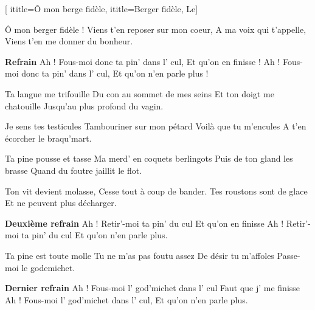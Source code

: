 [
  ititle={Ô mon berge fidèle},
  ititle={Berger fidèle, Le}]

  
\beginverse
Ô mon berger fidèle !
Viens t'en reposer sur mon coeur,
A ma voix qui t'appelle,
Viens t'en me donner du bonheur.
\endverse

\beginchorus
\textbf{Refrain}
Ah ! Fous-moi donc ta pin' dans l' cul,
Et qu'on en finisse !
Ah ! Fous-moi donc ta pin' dans l' cul,
Et qu'on n'en parle plus !
\endchorus

\beginverse
Ta langue me trifouille
Du con au sommet de mes seins
Et ton doigt me chatouille
Jusqu'au plus profond du vagin.
\endverse

\beginverse
Je sens tes testicules
Tambouriner sur mon pétard
Voilà que tu m'encules
A t'en écorcher le braqu'mart.
\endverse

\beginverse
Ta pine pousse et tasse
Ma merd' en coquets berlingots
Puis de ton gland les brasse
Quand du foutre jaillit le flot.
\endverse

\beginverse
Ton vit devient molasse,
Cesse tout à coup de bander.
Tes roustons sont de glace
Et ne peuvent plus décharger.
\endverse

\beginchorus
\textbf{Deuxième refrain}
Ah ! Retir'-moi ta pin' du cul
Et qu'on en finisse
Ah ! Retir'-moi ta pin' du cul
Et qu'on n'en parle plus.
\endchorus

\beginverse
Ta pine est toute molle
Tu ne m'as pas foutu assez
De désir tu m'affoles
Passe-moi le godemichet.
\endverse

\beginchorus
\textbf{Dernier refrain}
Ah ! Fous-moi l' god'michet dans l' cul
Faut que j' me finisse
Ah ! Fous-moi l' god'michet dans l' cul,
Et qu'on n'en parle plus.
\endchorus

\endsong
